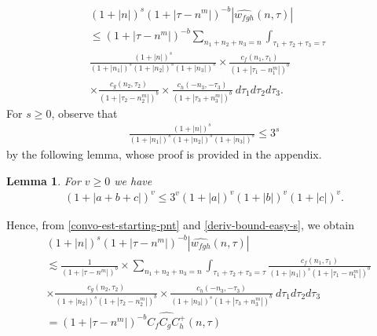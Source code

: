 \documentclass[12pt,reqno]{amsart}
\numberwithin{equation}{section}  %
\numberwithin{figure}{section}
\newcommand{\wh}{\widehat}
\theoremstyle{plain}
\newtheorem{lemma}{Lemma}
\theoremstyle{definition}
\theoremstyle{remark}
\begin{document}
\begin{equation}
	\label{convo-est-starting-pnt}
	\begin{split}
		 & \left (1 + |n| \right )^s \left( 1 + | \tau - n^{m } | \right)^{-b} | \wh{w_{fgh}}\left( 
		n, \tau \right) |
		\\
		& \le \left( 1 + | \tau - n^{m } | \right)^{-b}
		\sum_{n_1+ n_2+ n_3= n} 
    \int_{\tau_{1} + \tau_{2} + \tau_{3} = \tau}
    \\
    & \frac{\left (1 + |n| \right )^s}{\left (1 +
		|n_1| \right )^s \left (1 + | n_2| \right )^s \left (1 + |n_3| \right )^s} 
		\times \frac{c_f(n_1, \tau_1)}{\left( 1 + | \tau_1 - n_1^{m } | 
		\right)^{b}}
		\\
		& \times
		\frac{c_g(n_2, \tau_2)}{\left( 1 + | \tau_2 - n_2^{m } | 
		\right)^{b}} \times
		\frac{c_h(-n_3, -\tau_3)}{\left( 1 + | \tau_3 + n_3^{m } | 
		\right)^{b}}\ d \tau_1 d \tau_2 d \tau_3.
	\end{split}
\end{equation}
%
%
For $s \ge 0$, observe that
%
%
\begin{equation}
	\label{deriv-bound-easy-s}
	\begin{split}
		\frac{\left (1 + |n| \right ) ^s}{\left (1 + |n_1| \right ) ^s \left (1 + |n_2| \right ) ^s \left (1 + |n_3| \right ) ^s} 
		\le 3^{s}
	\end{split}
\end{equation}
%
%
by the following lemma, whose proof is provided in the appendix.
%
%
\begin{lemma}
\label{lem:splitting}
	For $v \ge 0$ we have
%
%
\begin{equation}
	\label{splitting}
	\begin{split}
		\left ( 1 + |a +b + c| \right)^v \le 3^v \left(1 + | a | \right)^v \left(
		1 + | b | \right)^v \left( 1 + | c | \right)^v.
	\end{split}
\end{equation}
%
%
\end{lemma}
%
%
Hence, from \eqref{convo-est-starting-pnt} and \eqref{deriv-bound-easy-s}, we 
obtain
%
\begin{equation*}
	\begin{split}
		& \left (1 + |n| \right )^s \left( 1 +  | \tau - n^{m }  | \right)^{-b} | 
		\wh{w_{fgh}}\left( n, \tau \right) | 
		\\
    & \lesssim  \frac{1}{\left( 1 +
		| \tau - n^{m}| 
		\right)^{b}}  
		\times
		\sum_{n_1+ n_2+ n_3= n} 
    \int_{\tau_{1} + \tau_{2} + \tau_{3} = \tau} \frac{c_f\left( n_1, \tau_1 
		\right)}{\left (1 + |n_1| \right )^s \left( 1 + | \tau_1 - n_1^{m} |
		\right)^{b}}
		\\
		& \times \frac{c_{g}\left( n_2, \tau_2 \right)}{\left (1 + |n_2| \right ) 
		^s\left( 1 + | \tau_2 -  n_2^{m }| 
		\right)^{b}}
    \times \frac{c_{h}\left( -n_3, -\tau_3 \right)}{\left (1 + |n_3| \right )
    ^s\left( 1 + | \tau_3 + n_3^{m } | \right)^{b}} \ d \tau_1 d \tau_2 d \tau_3
    \\
		& = \left( 1 + | \tau - n^{m } | \right)^{-b}
		\wh{C_f C_{g} C^+_{h}} \left( n, \tau \right)
	\end{split}
\end{equation*}
\end{document}
